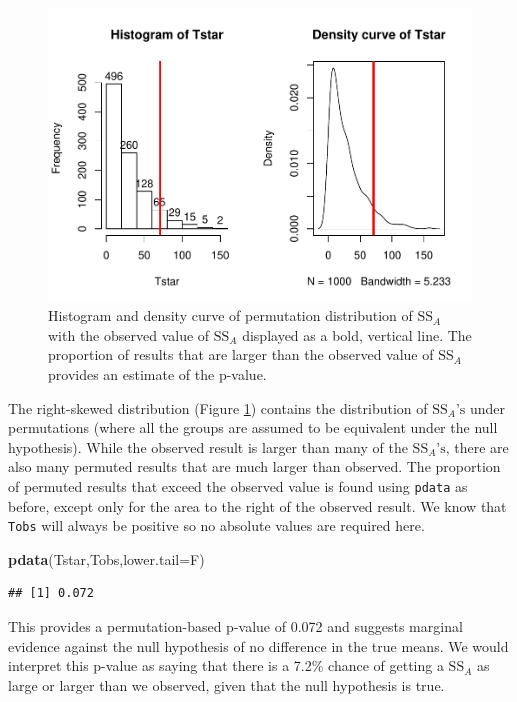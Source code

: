 \documentclass[]{book}
\newenvironment{Shaded}{\begin{snugshade}}{\end{snugshade}}
\newcommand{\KeywordTok}[1]{\textcolor[rgb]{0.13,0.29,0.53}{\textbf{#1}}}
\newcommand{\DataTypeTok}[1]{\textcolor[rgb]{0.13,0.29,0.53}{#1}}
\newcommand{\NormalTok}[1]{#1}
\begin{document}
\begin{figure}
\centering
\includegraphics{GreenwoodBanner_files/figure-latex/Figure3-5-1.pdf}
\caption{\label{fig:Figure3-5}Histogram and density curve of permutation distribution of
\(\text{SS}_A\) with the observed value of \(\text{SS}_A\) displayed as
a bold, vertical line. The proportion of results that are larger than
the observed value of \(\text{SS}_A\) provides an estimate of the
p-value.}
\end{figure}

The right-skewed distribution (Figure \ref{fig:Figure3-5}) contains the
distribution of \(\text{SS}_A\text{'s}\) under permutations (where all
the groups are assumed to be equivalent under the null hypothesis).
While the observed result is larger than many of the
\(\text{SS}_A\text{'s}\), there are also many permuted results that are
much larger than observed. The proportion of permuted results that
exceed the observed value is found using \texttt{pdata} as before,
except only for the area to the right of the observed result. We know
that \texttt{Tobs} will always be positive so no absolute values are
required here.

\begin{Shaded}
\begin{Highlighting}[]
\KeywordTok{pdata}\NormalTok{(Tstar,Tobs,}\DataTypeTok{lower.tail=}\NormalTok{F)}
\end{Highlighting}
\end{Shaded}

\begin{verbatim}
## [1] 0.072
\end{verbatim}

This provides a permutation-based p-value of 0.072 and suggests marginal
evidence against the null hypothesis of no difference in the true means.
We would interpret this p-value as saying that there is a 7.2\% chance
of getting a \(\text{SS}_A\) as large or larger than we observed, given
that the null hypothesis is true.
\end{document}

